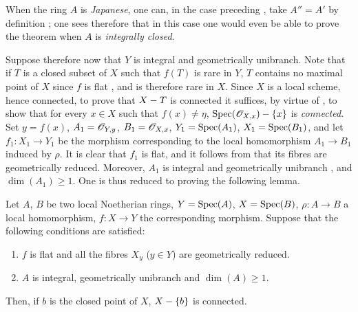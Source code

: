 \begin{remark}[18.9.7.1]
\label{IV.18.9.7.1}
When the ring $A$ is \emph{Japanese}, one can, in the case preceding , take $A''=A'$ by definition ;
one sees therefore that in this case one would even be able to prove the theorem when $A$ is \emph{integrally closed}.
\end{remark}

\begin{env}[18.9.7.2]
\label{IV.18.9.7.2}
Suppose therefore now that $Y$ is integral and geometrically unibranch.
Note that if $T$ is a closed subset of $X$ such that $f(T)$ is rare in $Y$, $T$ contains no maximal point of $X$ since $f$ is flat , and is therefore rare in $X$.
Since $X$ is a local scheme, hence connected, to prove that $X- T$ is connected it suffices, by virtue of , to show that for every $x\in X$ such that $f(x)\neq\eta$, $\operatorname{Spec}(\mathscr{O}_{X,x})-\{x\}$ is \emph{connected}.
Set $y=f(x)$, $A_1=\mathscr{O}_{Y,y}$, $B_1=\mathscr{O}_{X,x}$, $Y_1=\operatorname{Spec}(A_1)$, $X_1=\operatorname{Spec}(B_1)$, and let $f_1:X_1\to Y_1$ be the morphism corresponding to the local homomorphism $A_1\to B_1$ induced by $\rho$.
It is clear that $f_1$ is flat, and it follows from  that its fibres are geometrically reduced.
Moreover, $A_1$ is integral and geometrically unibranch , and $\dim(A_1)\geq 1$.
One is thus reduced to proving the following lemma.
\end{env}

\begin{lemma}[18.9.7.3]
\label{IV.18.9.7.3}
Let $A$, $B$ be two local Noetherian rings, $Y=\operatorname{Spec}(A)$, $X=\operatorname{Spec}(B)$, $\rho:A\to B$ a local homomorphism, $f:X\to Y$ the corresponding morphism.
Suppose that the following conditions are satisfied:
\begin{enumerate}[label=\emph{\roman*)}]
  \item $f$ is flat and all the fibres $X_y$ \textup{(}$y\in Y$\textup{)} are geometrically reduced.
  \item $A$ is integral, geometrically unibranch and $\dim(A)\geq 1$.
\end{enumerate}
Then, if $b$ is the closed point of $X$, $X-\{b\}$ is connected.
\end{lemma}


